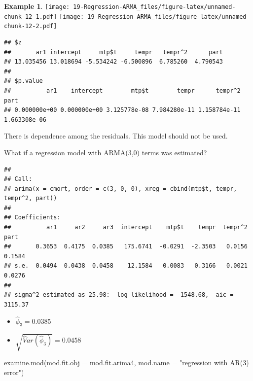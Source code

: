 \documentclass[
]{book}
\newenvironment{Shaded}{\begin{snugshade}}{\end{snugshade}}
\newcommand{\AttributeTok}[1]{\textcolor[rgb]{0.77,0.63,0.00}{#1}}
\newcommand{\DecValTok}[1]{\textcolor[rgb]{0.00,0.00,0.81}{#1}}
\newcommand{\FunctionTok}[1]{\textcolor[rgb]{0.00,0.00,0.00}{#1}}
\newcommand{\NormalTok}[1]{#1}
\newcommand{\OtherTok}[1]{\textcolor[rgb]{0.56,0.35,0.01}{#1}}
\newcommand{\SpecialCharTok}[1]{\textcolor[rgb]{0.00,0.00,0.00}{#1}}
\newcommand{\StringTok}[1]{\textcolor[rgb]{0.31,0.60,0.02}{#1}}
\theoremstyle{definition}
\theoremstyle{definition}
\newtheorem{example}{Example}[chapter]
\theoremstyle{definition}
\theoremstyle{definition}
\theoremstyle{remark}
\begin{document}
\begin{example}
\texttt{[image: 19-Regression-ARMA\_files/figure-latex/unnamed-chunk-12-1.pdf]} \texttt{[image: 19-Regression-ARMA\_files/figure-latex/unnamed-chunk-12-2.pdf]}

\begin{verbatim}
## $z
##       ar1 intercept     mtp$t     tempr   tempr^2      part 
## 13.035456 13.018694 -5.534242 -6.500896  6.785260  4.790543 
## 
## $p.value
##          ar1    intercept        mtp$t        tempr      tempr^2         part 
## 0.000000e+00 0.000000e+00 3.125778e-08 7.984280e-11 1.158784e-11 1.663308e-06
\end{verbatim}

There is dependence among the residuals. This model should not be used.

What if a regression model with ARMA(3,0) terms was estimated?

\begin{Shaded}
\end{Shaded}

\begin{verbatim}
## 
## Call:
## arima(x = cmort, order = c(3, 0, 0), xreg = cbind(mtp$t, tempr, tempr^2, part))
## 
## Coefficients:
##          ar1     ar2     ar3  intercept    mtp$t    tempr  tempr^2    part
##       0.3653  0.4175  0.0385   175.6741  -0.0291  -2.3503   0.0156  0.1584
## s.e.  0.0494  0.0438  0.0458    12.1584   0.0083   0.3166   0.0021  0.0276
## 
## sigma^2 estimated as 25.98:  log likelihood = -1548.68,  aic = 3115.37
\end{verbatim}

\begin{itemize}
\item
  \(\hat \phi_3=0.0385\)
\item
  \(\sqrt{\hat Var(\hat \phi_3)}=0.0458\)
\end{itemize}

\begin{Shaded}
\begin{Highlighting}[]
\FunctionTok{examine.mod}\NormalTok{(}\AttributeTok{mod.fit.obj =}\NormalTok{ mod.fit.arima4, mod.name}
     \OtherTok{=} \StringTok{"regression with AR(3) error"}\NormalTok{)}
\end{Highlighting}
\end{Shaded}


\end{example}
\end{document}

